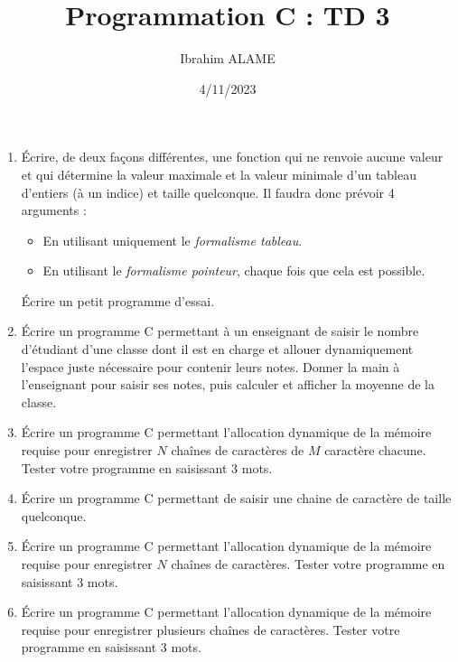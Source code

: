 \documentclass[a4paper]{article}
\title{Programmation C : TD 3}
\author{Ibrahim ALAME}
\date{4/11/2023}
\begin{document}
\maketitle

\begin{enumerate}
\item Écrire, de deux façons différentes, une fonction qui ne renvoie aucune valeur et qui détermine
 la valeur maximale et la valeur minimale d'un tableau d'entiers (à un indice) et taille quelconque. 
 Il faudra donc prévoir 4 arguments :
 \begin{itemize}
 \item En utilisant uniquement le {\em formalisme tableau}.
 \item En utilisant  le {\em formalisme pointeur}, chaque fois que cela est possible.
 \end{itemize}
Écrire un petit programme d'essai.

\item Écrire un programme C permettant à un enseignant de saisir le nombre d'étudiant d'une classe dont il est en charge et allouer dynamiquement l'espace juste nécessaire pour contenir leurs notes. Donner la main à l'enseignant pour saisir ses notes, puis calculer et afficher la moyenne de la classe.
 
 \item  Écrire un programme C permettant l'allocation dynamique de la mémoire requise pour enregistrer $N$ chaînes de caractères de $M$ caractère chacune. Tester votre programme en saisissant 3 mots.
\item Écrire un programme C permettant de saisir une chaine de caractère de taille quelconque.
 \item  Écrire un programme C permettant l'allocation dynamique de la mémoire requise pour enregistrer $N$ chaînes de caractères. Tester votre programme en saisissant 3 mots.
 \item  Écrire un programme C permettant l'allocation dynamique de la mémoire requise pour enregistrer plusieurs chaînes de caractères.  Tester votre programme en saisissant 3 mots.
\end{enumerate}
\end{document}

